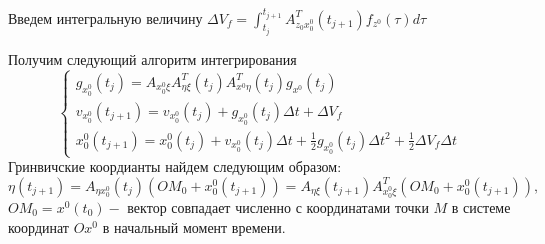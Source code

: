 \documentclass[a4paper,14pt]{article}
\theoremstyle{plain} %
\theoremstyle{definition} %
\theoremstyle{remark} %
\begin{document}
{Введем интегральную величину $\Delta V_{f}=\int_{t_{j}}^{t_{j+1}} A_{z_{0} x_{0}^{0}}^{T}\left(t_{j+1}\right) f_{z^{0}}(\tau) d \tau$

Получим следующий алгоритм интегрирования
$$
    \left\{\begin{array}{l}
        g_{x_{0}^{0}}\left(t_{j}\right)=A_{x_{0}^{0} \xi} A_{\eta \xi}^{T}\left(t_{j}\right) A_{x^{0} \eta}^{T}\left(t_{j}\right) g_{x^{0}}\left(t_{j}\right) \\
        v_{x_{0}^{0}}\left(t_{j+1}\right)=v_{x_{0}^{0}}\left(t_{j}\right)+g_{x_{0}^{0}}\left(t_{j}\right) \Delta t+\Delta V_{f}                               \\
        x_{0}^{0}\left(t_{j+1}\right)=x_{0}^{0}\left(t_{j}\right)+v_{x_{0}^{0}}\left(t_{j}\right) \Delta t+\frac{1}{2} g_{x_{0}^{0}}\left(t_{j}\right) \Delta t^{2}+\frac{1}{2} \Delta V_{f} \Delta t
    \end{array}\right.
$$
Гринвичские коордианты найдем следующим образом:
$$
    \eta\left(t_{j+1}\right)=A_{\eta x_{0}^{0}}\left(t_{j}\right)\left(O M_{0}+x_{0}^{0}\left(t_{j+1}\right)\right)=A_{\eta \xi}\left(t_{j+1}\right) A_{x_{0}^{0} \xi}^{T}\left(O M_{0}+x_{0}^{0}\left(t_{j+1}\right)\right),
$$
$O M_{0}=x^{0}\left(t_{0}\right)-$ вектор совпадает численно с координатами точки $M$ в системе координат $O x^{0}$ в начальный момент времени.

}
\end{document}
